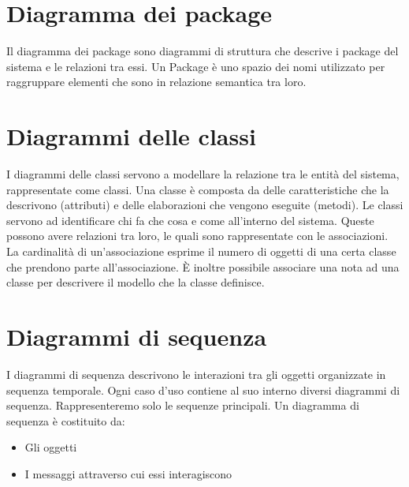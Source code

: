 \section{Diagramma dei package}
Il diagramma dei package sono diagrammi di struttura che descrive i package del sistema e le relazioni tra essi.
Un Package è uno spazio dei nomi utilizzato per raggruppare elementi che sono in relazione semantica tra loro.

\section{Diagrammi delle classi}
I diagrammi delle classi servono a modellare la relazione tra le entità del sistema, rappresentate come classi.
Una classe è composta da delle caratteristiche che la descrivono (attributi) e delle elaborazioni che vengono eseguite (metodi). 
Le classi servono ad identificare chi fa che cosa e come all’interno del sistema. Queste possono avere relazioni tra loro, le quali sono rappresentate con le associazioni. La cardinalità di un’associazione esprime il numero di oggetti di una certa classe che prendono parte all’associazione.
È inoltre possibile associare una nota ad una classe per descrivere il modello che la classe definisce.

\section{Diagrammi di sequenza}
I diagrammi di sequenza descrivono le interazioni tra gli oggetti organizzate in sequenza temporale. Ogni caso d’uso contiene al suo interno diversi diagrammi di sequenza. Rappresenteremo solo le sequenze principali.
Un diagramma di sequenza è costituito da:
\begin{itemize}
	\item Gli oggetti
	\item I messaggi attraverso cui essi interagiscono
\end{itemize}

